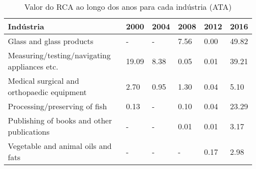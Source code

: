 \begin{table}
\centering
\caption{Valor do RCA ao longo dos anos para cada indústria (ATA)}
\begin{tabular}{p{6cm}p{1.5cm}p{1.5cm}p{1.5cm}p{1.5cm}p{1.5cm}}
\toprule
                                   Indústria &  2000 & 2004 & 2008 & 2012 &  2016 \\
\midrule
                    Glass and glass products &     - &    - & 7.56 & 0.00 & 49.82 \\
Measuring/testing/navigating appliances etc. & 19.09 & 8.38 & 0.05 & 0.01 & 39.21 \\
  Medical surgical and orthopaedic equipment &  2.70 & 0.95 & 1.30 & 0.04 &  5.10 \\
               Processing/preserving of fish &  0.13 &    - & 0.10 & 0.04 & 23.29 \\
  Publishing of books and other publications &     - &    - & 0.01 & 0.01 &  3.17 \\
          Vegetable and animal oils and fats &     - &    - &    - & 0.17 &  2.98 \\
\bottomrule
\end{tabular}
\end{table}
